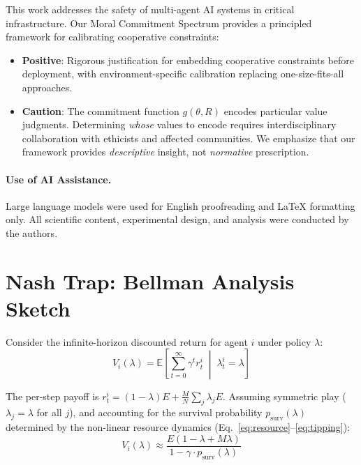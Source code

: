 \documentclass{article}
\begin{document}
This work addresses the safety of multi-agent AI systems in critical infrastructure.
Our Moral Commitment Spectrum provides a principled framework for calibrating cooperative constraints:
\begin{itemize}
    \item \textbf{Positive}: Rigorous justification for embedding cooperative constraints before deployment, with environment-specific calibration replacing one-size-fits-all approaches.
    \item \textbf{Caution}: The commitment function $g(\theta, R)$ encodes particular value judgments. Determining \emph{whose} values to encode requires interdisciplinary collaboration with ethicists and affected communities.
    We emphasize that our framework provides \textit{descriptive} insight, not \textit{normative} prescription.
\end{itemize}

\paragraph{Use of AI Assistance.} Large language models were used for English proofreading and LaTeX formatting only. All scientific content, experimental design, and analysis were conducted by the authors.




\newpage
\appendix

\section{Nash Trap: Bellman Analysis Sketch}
\label{app:nash_trap}

Consider the infinite-horizon discounted return for agent $i$ under policy $\lambda$:
\begin{equation}
V_i(\lambda) = \mathbb{E}\left[\sum_{t=0}^{\infty} \gamma^t r_t^i \;\middle|\; \lambda_t^i = \lambda\right]
\end{equation}

The per-step payoff is $r_t^i = (1 - \lambda) E + \frac{M}{N} \sum_j \lambda_j E$.
Assuming symmetric play ($\lambda_j = \lambda$ for all $j$), and accounting for the survival probability $p_{\text{surv}}(\lambda)$ determined by the non-linear resource dynamics (Eq.~\ref{eq:resource}--\ref{eq:tipping}):
\begin{equation}
V_i(\lambda) \approx \frac{E(1 - \lambda + M\lambda)}{1 - \gamma \cdot p_{\text{surv}}(\lambda)}
\end{equation}
\end{document}
